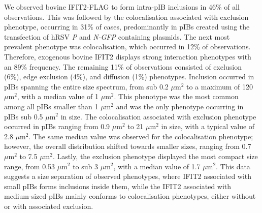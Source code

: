We observed bovine IFIT2-FLAG to form intra-pIB inclusions in 46\% of all observations. This was followed by the colocalisation associated with exclusion phenotype, occurring in 31\% of cases, predominantly in pIBs created using the transfection of hRSV \textit{P} and \textit{N-GFP} containing plasmids. The next most prevalent phenotype was colocalisation, which occurred in 12\% of observations. Therefore, exogenous bovine IFIT2 displays strong interaction phenotypes with an 89\% frequency. The remaining 11\% of observations consisted of exclusion (6\%), edge exclusion (4\%), and diffusion (1\%) phenotypes. Inclusion occurred in pIBs spanning the entire size spectrum, from sub 0.2 \(\mu \mbox{m}^2\) to a maximum of 120 \(\mu \mbox{m}^2\), with a median value of 1 \(\mu \mbox{m}^2\). This phenotype was the most common among all pIBs smaller than 1 \(\mu \mbox{m}^2\) and was the only phenotype occurring in pIBs sub 0.5 \(\mu \mbox{m}^2\) in size. The colocalisation associated with exclusion phenotype occurred in pIBs ranging from 0.9 \(\mu \mbox{m}^2\) to 21 \(\mu \mbox{m}^2\) in size, with a typical value of 2.8 \(\mu \mbox{m}^2\). The same median value was observed for the colocalisation phenotype; however, the overall distribution shifted towards smaller sizes, ranging from 0.7 \(\mu \mbox{m}^2\) to 7.5 \(\mu \mbox{m}^2\). Lastly, the exclusion phenotype displayed the most compact size range, from 0.53 \(\mu \mbox{m}^2\) to sub 3 \(\mu \mbox{m}^2\), with a median value of 1.7 \(\mu \mbox{m}^2\). This data suggests a size separation of observed phenotypes, where IFIT2 associated with small pIBs forms inclusions inside them, while the IFIT2 associated with medium-sized pIBs mainly conforms to colocalisation phenotypes, either without or with associated exclusion.

